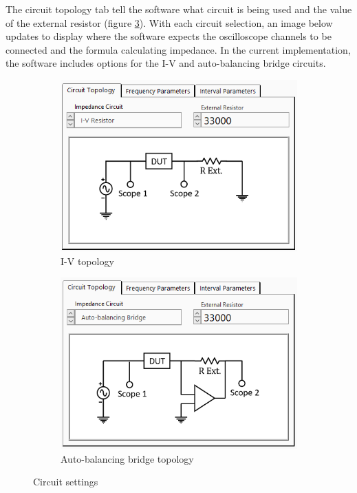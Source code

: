 \par The circuit topology tab tell the software what circuit is being used and the value of the external resistor (figure \ref{fig:labview_circuit_settings}). With each circuit selection, an image below updates to display where the software expects the oscilloscope channels to be connected and the formula calculating impedance. In the current implementation, the software includes options for the I-V and auto-balancing bridge circuits. 


\begin{figure}[h]
    \centering
    \begin{subfigure}[b]{0.48\textwidth}
        \centering
        \includegraphics[width=\textwidth]{images/labview_circuit_IV.png}
        \caption{I-V topology}
        \label{fig:labview_I-V_circ}
    \end{subfigure}
    \hfill
    \begin{subfigure}[b]{0.48\textwidth}
        \centering
        \includegraphics[width=\textwidth]{images/labview_circuit_auto.png}
        \caption{Auto-balancing bridge topology}
        \label{fig:labview_auto_circ}
    \end{subfigure}
    \caption{Circuit settings}
    \label{fig:labview_circuit_settings}
\end{figure}

